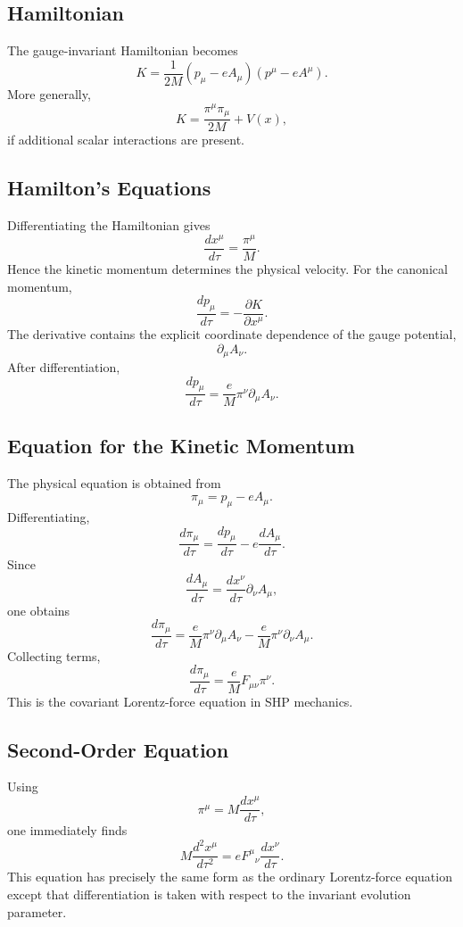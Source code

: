 \subsection{Hamiltonian}
The gauge-invariant Hamiltonian becomes
\[\boxed{K=\frac{1}{2M}(p_\mu-eA_\mu)(p^\mu-eA^\mu).}\]
More generally,
\[K=\frac{\pi^\mu\pi_\mu}{2M}+V(x),\]
if additional scalar interactions are present.
\subsection{Hamilton's Equations}
Differentiating the Hamiltonian gives
\[\boxed{\frac{dx^\mu}{d\tau}=\frac{\pi^\mu}{M}.}\]
Hence the kinetic momentum determines the physical velocity.
For the canonical momentum,
\[\frac{dp_\mu}{d\tau}=-\frac{\partial K}{\partial x^\mu}.\]
The derivative contains the explicit coordinate dependence of the gauge
potential,
\[\partial_\mu A_\nu.\]
After differentiation,
\[\boxed{\frac{dp_\mu}{d\tau}=\frac{e}{M}\pi^\nu\partial_\mu A_\nu.}\]
\subsection{Equation for the Kinetic Momentum}
The physical equation is obtained from
\[\pi_\mu=p_\mu-eA_\mu.\]
Differentiating,
\[\frac{d\pi_\mu}{d\tau}=\frac{dp_\mu}{d\tau}-e\frac{dA_\mu}{d\tau}.\]
Since
\[\frac{dA_\mu}{d\tau}=\frac{dx^\nu}{d\tau}\partial_\nu A_\mu,\]
one obtains
\[\frac{d\pi_\mu}{d\tau}=\frac{e}{M}\pi^\nu\partial_\mu A_\nu
-\frac{e}{M}\pi^\nu\partial_\nu A_\mu.\]
Collecting terms,
\[\boxed{\frac{d\pi_\mu}{d\tau}=\frac{e}{M}F_{\mu\nu}\pi^\nu.}\]
This is the covariant Lorentz-force equation in SHP mechanics.
\subsection{Second-Order Equation}
Using
\[\pi^\mu=M\frac{dx^\mu}{d\tau},\]
one immediately finds
\[\boxed{M\frac{d^2x^\mu}{d\tau^2}=eF^\mu{}_\nu\frac{dx^\nu}{d\tau}.}\]
This equation has precisely the same form as the ordinary Lorentz-force
equation except that differentiation is taken with respect to the
invariant evolution parameter.
